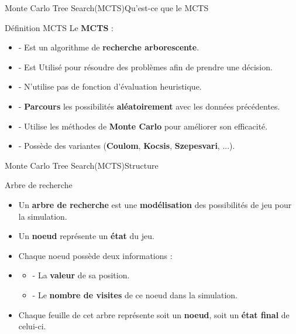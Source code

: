 \begin{frame}{Monte Carlo Tree Search(MCTS)}{Qu'est-ce que le MCTS}
	\begin{block}{Définition MCTS}
		Le \textbf{MCTS} :
		\begin{itemize}
			\item - Est un algorithme de \textbf{recherche arborescente}.
			\item - Est Utilisé pour résoudre des problèmes afin de prendre une décision.
			\item - N'utilise pas de fonction d'évaluation heuristique.
			\item - \textbf{Parcours} les possibilités \textbf{aléatoirement} avec les données précédentes.
			\item - Utilise les méthodes de \textbf{Monte Carlo} pour améliorer son efficacité.
			\item - Possède des variantes (\textbf{Coulom}, \textbf{Kocsis}, \textbf{Szepesvari}, ...).
		\end{itemize}
	\end{block}
\end{frame}

\begin{frame}{Monte Carlo Tree Search(MCTS)}{Structure}
	\begin{block}{Arbre de recherche}
		\begin{itemize}
			\item Un \textbf{arbre de recherche} est une \textbf{modélisation} des possibilités de jeu pour la simulation.
			\item Un \textbf{noeud} représente un \textbf{état} du jeu.
			\item Chaque noeud possède deux informations :
			\item\begin{itemize}
				      \item - La \textbf{valeur} de sa position.
				      \item - Le \textbf{nombre de visites} de ce noeud dans la simulation.
			      \end{itemize}
			\item Chaque feuille de cet arbre représente soit un \textbf{noeud}, soit un \textbf{état final} de celui-ci.
		\end{itemize}
	\end{block}
\end{frame}


